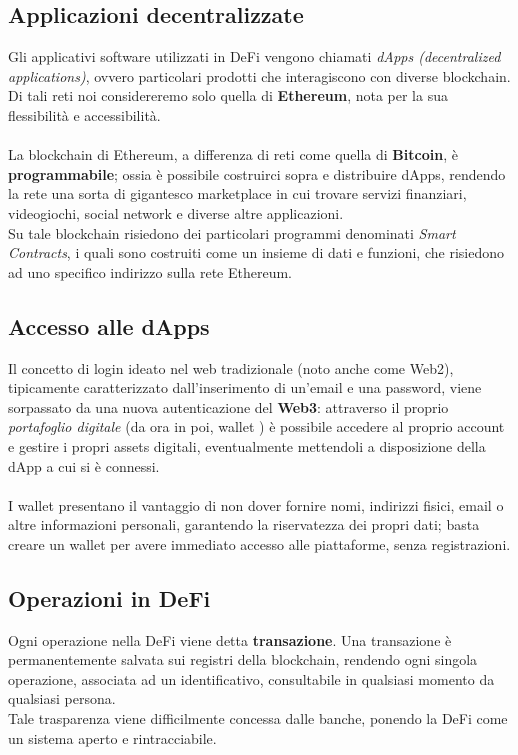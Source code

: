 \documentclass[12pt,a4paper]{report}
\begin{document}
\subsection{Applicazioni decentralizzate}
Gli applicativi software utilizzati in DeFi vengono chiamati \textit{dApps (decentralized applications)}, ovvero particolari prodotti che interagiscono con diverse blockchain. Di tali reti noi considereremo solo quella di \textbf{Ethereum}\cite{ethereum}, nota per la sua flessibilità e accessibilità.\\\\
La blockchain di Ethereum, a differenza di reti come quella di \textbf{Bitcoin}\cite{bitcoin}, è \textbf{programmabile}; ossia è possibile costruirci sopra e distribuire dApps, rendendo la rete una sorta di gigantesco marketplace in cui trovare servizi finanziari, videogiochi, social network e diverse altre applicazioni.
\\Su tale blockchain risiedono dei particolari programmi denominati \textit{Smart Contracts}\cite{smartcontracts}, i quali sono costruiti come un insieme di dati e funzioni, che risiedono ad uno specifico indirizzo sulla rete Ethereum.


\subsection{Accesso alle dApps}

Il concetto di login ideato nel web tradizionale (noto anche come Web2), tipicamente caratterizzato dall'inserimento di un'email e una password, viene sorpassato da una nuova autenticazione del \textbf{Web3}\cite{web2_web3}: attraverso il proprio \textit{portafoglio digitale} (da ora in poi, wallet \cite{wallet}) è possibile accedere al proprio account e gestire i propri assets digitali, eventualmente mettendoli a disposizione della dApp a cui si è connessi.
\\\\I wallet presentano il vantaggio di non dover fornire nomi, indirizzi fisici, email o altre informazioni personali, garantendo la riservatezza dei propri dati; basta creare un wallet per avere immediato accesso alle piattaforme, senza registrazioni.



\subsection{Operazioni in DeFi}
Ogni operazione nella DeFi viene detta \textbf{transazione}. Una transazione è permanentemente salvata sui registri della blockchain, rendendo ogni singola operazione, associata ad un identificativo, consultabile in qualsiasi momento da qualsiasi persona.
\\Tale trasparenza viene difficilmente concessa dalle banche, ponendo la DeFi come un sistema aperto e rintracciabile.
\end{document}
